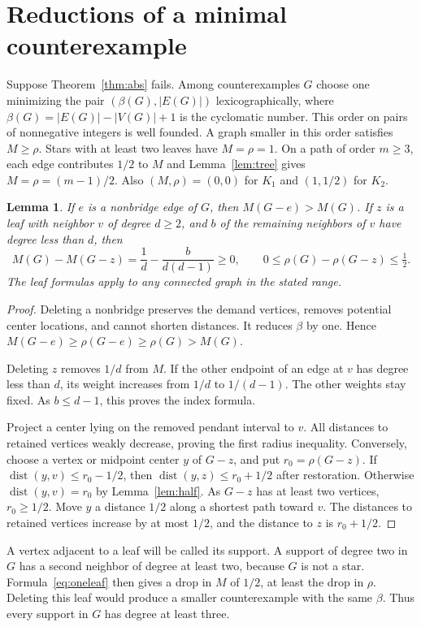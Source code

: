 \documentclass[11pt,a4paper]{article}
\newtheorem{lemma}[theorem]{Lemma}
\newcommand{\dist}{\operatorname{dist}}
\begin{document}
\section{Reductions of a minimal counterexample}\label{sec:red}
Suppose Theorem~\ref{thm:abs} fails. Among counterexamples $G$ choose
one minimizing the pair $(\beta(G),|E(G)|)$ lexicographically, where
$\beta(G)=|E(G)|-|V(G)|+1$ is the cyclomatic number. This order on
pairs of nonnegative integers is well founded. A graph smaller in this
order satisfies $M\ge\rho$. Stars with at least two leaves have
$M=\rho=1$. On a path of order $m\ge3$, each edge contributes $1/2$
to $M$ and Lemma~\ref{lem:tree} gives $M=\rho=(m-1)/2$. Also
$(M,\rho)=(0,0)$ for $K_1$ and $(1,1/2)$ for $K_2$.

\begin{lemma}\label{lem:delete}
If $e$ is a nonbridge edge of $G$, then $M(G-e)>M(G)$. If $z$ is
a leaf with neighbor $v$ of degree $d\ge2$, and $b$ of the remaining
neighbors of $v$ have degree less than $d$, then
\begin{equation}\label{eq:oneleaf}
 M(G)-M(G-z)=\frac1d-\frac{b}{d(d-1)}\ge0,\qquad
 0\le\rho(G)-\rho(G-z)\le\tfrac12.
\end{equation}
The leaf formulas apply to any connected graph in the stated range.
\end{lemma}
\begin{proof}
Deleting a nonbridge preserves the demand vertices, removes potential
center locations, and cannot shorten distances. It reduces $\beta$ by
one. Hence $M(G-e)\ge\rho(G-e)\ge\rho(G)>M(G)$.

Deleting $z$ removes $1/d$ from $M$. If the other endpoint of an edge
at $v$ has degree less than $d$, its weight increases from $1/d$ to
$1/(d-1)$. The other weights stay fixed. As $b\le d-1$, this proves
the index formula.

Project a center lying on the removed pendant interval to $v$. All
distances to retained vertices weakly decrease, proving the first
radius inequality. Conversely, choose a vertex or midpoint center $y$
of $G-z$, and put $r_0=\rho(G-z)$. If $\dist(y,v)\le r_0-1/2$,
then $\dist(y,z)\le r_0+1/2$ after restoration. Otherwise
$\dist(y,v)=r_0$ by Lemma~\ref{lem:half}. As $G-z$ has at least two
vertices, $r_0\ge1/2$. Move $y$ a distance $1/2$ along a shortest
path toward $v$. The distances to retained vertices increase by at
most $1/2$, and the distance to $z$ is $r_0+1/2$.
\end{proof}

A vertex adjacent to a leaf will be called its support. A support of
degree two in $G$ has a second neighbor of degree at least two, because
$G$ is not a star. Formula~\eqref{eq:oneleaf} then gives a drop in
$M$ of $1/2$, at least the drop in $\rho$. Deleting this leaf would
produce a smaller counterexample with the same $\beta$. Thus every
support in $G$ has degree at least three.
\end{document}
